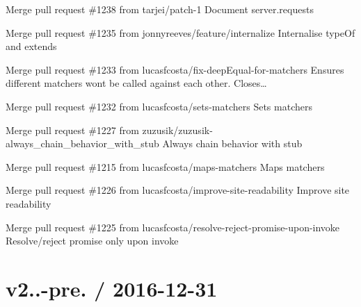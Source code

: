 \begin{DoxyItemize}
\item Merge pull request \#1238 from tarjei/patch-\/1 Document server.\+requests
\item Merge pull request \#1235 from jonnyreeves/feature/internalize Internalise {\ttfamily type\+Of} and {\ttfamily extends}
\item Merge pull request \#1233 from lucasfcosta/fix-\/deep\+Equal-\/for-\/matchers Ensures different matchers won\textquotesingle{}t be called against each other. Closes…
\item Merge pull request \#1232 from lucasfcosta/sets-\/matchers Sets matchers
\item Merge pull request \#1227 from zuzusik/zuzusik-\/always\+\_\+chain\+\_\+behavior\+\_\+with\+\_\+stub Always chain behavior with stub
\item Merge pull request \#1215 from lucasfcosta/maps-\/matchers Maps matchers
\item Merge pull request \#1226 from lucasfcosta/improve-\/site-\/readability Improve site readability
\item Merge pull request \#1225 from lucasfcosta/resolve-\/reject-\/promise-\/upon-\/invoke Resolve/reject promise only upon invoke
\end{DoxyItemize}

\section*{v2..-\/pre. / 2016-\/12-\/31 }


